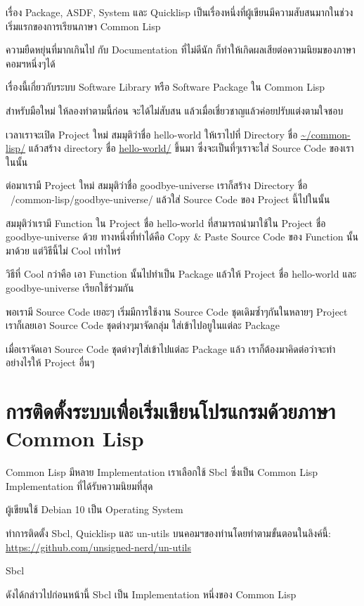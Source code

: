 \documentclass[a4paper]{article}
\begin{document}
เรื่อง Package, ASDF, System และ Quicklisp
เป็นเรื่องหนึ่งที่ผู้เขียนมีความสับสนมากในช่วงเริ่มแรกของการเรียนภาษา Common Lisp

ความยืดหยุ่นที่มากเกินไป กับ Documentation ที่ไม่ดีนัก
ก็ทำให้เกิดผลเสียต่อความนิยมของภาษาคอมฯหนึ่งๆได้

เรื่องนี้เกี่ยวกับระบบ Software Library หรือ Software Package ใน Common Lisp

สำหรับมือใหม่ ให้ลองทำตามนี้ก่อน จะได้ไม่สับสน แล้วเมื่อเชี่ยวชาญแล้วค่อยปรับแต่งตามใจชอบ

เวลาเราจะเปิด Project ใหม่ สมมุติว่าชื่อ hello-world ให้เราไปที่ Directory ชื่อ
\url{~/common-lisp/} แล้วสร้าง directory ชื่อ \url{hello-world/} ขึ้นมา ซึ่งจะเป็นที่ๆเราจะใส่
Source Code ของเราในนั้น

ต่อมาเรามี Project ใหม่ สมมุติว่าชื่อ goodbye-universe เราก็สร้าง Directory ชื่อ
~/common-lisp/goodbye-universe/ แล้วใส่ Source Code ของ Project นี้ไปในนั้น

สมมุติว่าเรามี Function ใน Project ชื่อ hello-world ที่สามารถนำมาใช้ใน Project ชื่อ
goodbye-universe ด้วย ทางหนึ่งที่ทำได้คือ Copy \& Paste Source Code ของ Function
นั้นมาด้วย แต่วิธีนี้ไม่ Cool เท่าไหร่

วิธีที่ Cool กว่าคือ เอา Function นั้นไปทำเป็น Package แล้วให้ Project ชื่อ
hello-world และ goodbye-universe เรียกใช้ร่วมกัน

พอเรามี Source Code เยอะๆ เริ่มมีการใช้งาน Source Code ชุดเดิมซ้ำๆกันในหลายๆ
Project เราก็เลยเอา Source Code ชุดต่างๆมาจัดกลุ่ม ใส่เข้าไปอยูในแต่ละ Package

เมื่อเราจัดเอา Source Code ชุดต่างๆใส่เข้าไปแต่ละ Package แล้ว
เราก็ต้องมาคิดต่อว่าจะทำอย่างไรให้ Project อื่นๆ 

\section{การติดตั้งระบบเพื่อเริ่มเขียนโปรแกรมด้วยภาษา Common Lisp}

Common Lisp มีหลาย Implementation เราเลือกใช้ Sbcl ซึ่งเป็น Common Lisp Implementation ที่ได้รับความนิยมที่สุด

ผู้เขียนใช้ Debian 10 เป็น Operating System

ทำการติดตั้ง Sbcl, Quicklisp และ un-utils บนคอมฯของท่านโดยทำตามขั้นตอนในลิงค์นี้:
\href{https://github.com/unsigned-nerd/un-utils}{https://github.com/unsigned-nerd/un-utils}

Sbcl

ดังได้กล่าวไปก่อนหน้านี้ Sbcl เป็น Implementation หนึ่งของ Common Lisp
\end{document}
